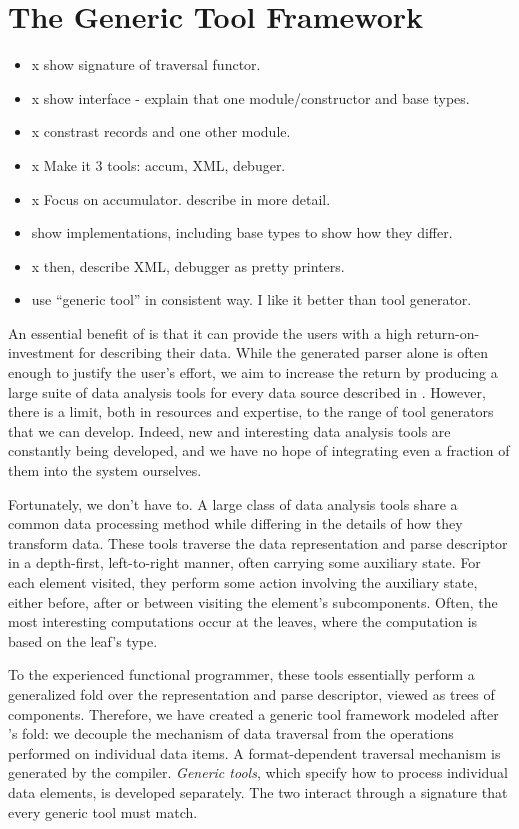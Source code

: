 \section{The Generic Tool Framework}
\label{sec:gen-tool}

\begin{itemize}
\item x show signature of traversal functor.
\item x show interface - explain that one module/constructor and base types.
\item x constrast records and one other module.
\item x Make it 3 tools: accum, XML, debuger.
\item x Focus on accumulator. describe in more detail.
\item show implementations,  including base types to show how they differ.
\item x then, describe XML, debugger as pretty printers.
\item use ``generic tool'' in consistent way. I like it better than
  tool generator.
\end{itemize}

An essential benefit of \padsml{} is that it can provide the users
with a high return-on-investment for describing their data. While the
generated parser alone is often enough to justify the user's effort,
we aim to increase the return by producing a large suite of data
analysis tools for every data source described in \padsml{}. However,
there is a limit, both in resources and expertise, to the range of
tool generators that we can develop. Indeed, new and interesting data
analysis tools are constantly being developed, and we have no hope of
integrating even a fraction of them into the \padsml{} system
ourselves.

Fortunately, we don't have to. A large class of data analysis tools
share a common data processing method while differing in the details
of how they transform data. These tools traverse the data
representation and parse descriptor in a depth-first, left-to-right
manner, often carrying some auxiliary state.  For each element
visited, they perform some action involving the auxiliary state,
either before, after or between visiting the element's subcomponents.
Often, the most interesting computations occur at the leaves, where
the computation is based on the leaf's type.  

To the experienced functional programmer, these tools essentially
perform a generalized fold over the representation and parse
descriptor, viewed as trees of components. Therefore, we have created
a generic tool framework modeled after \ml{}'s fold: we decouple the
mechanism of data traversal from the operations performed on
individual data items. A format-dependent traversal mechanism is
generated by the \padsml{} compiler. \emph{Generic tools}, which
specify how to process individual data elements, is developed
separately. The two interact through a signature that every generic
tool must match.

